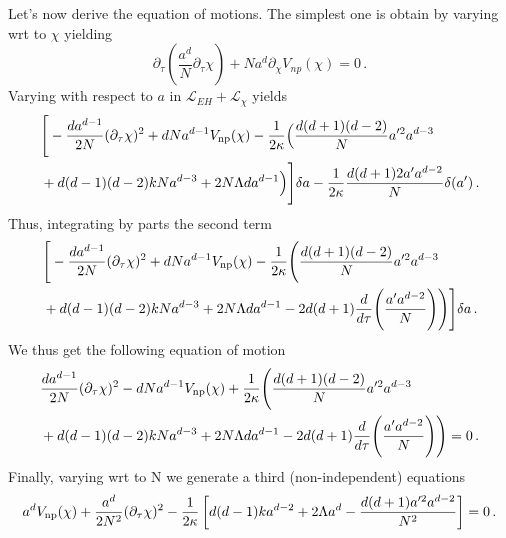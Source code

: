 \documentclass[a4paper]{article}
\begin{document}
Let's now derive the equation of motions. The simplest one is obtain by varying wrt to $\chi$ yielding
\begin{equation}
  \partial_\tau\left(\frac{a^d}{N}\partial_\tau \chi\right)+Na^{d}\partial_{\chi}V_{np}(\chi)=0\,.
\end{equation}
Varying with respect to $a$ in $\mathcal{L}_{EH}+\mathcal{L}_{\chi}$ yields
\begin{equation}
  \begin{aligned}
    &\Bigg[-\frac{d a^{d-1}}{2N}(\partial_\tau \chi)^2+d N a^{d-1} V_{\rm np}(\chi)-\frac{1}{2\kappa}\Big(\frac{d(d+1)(d-2)}{N}a'^2a^{d-3}\\
    &+d(d-1)(d-2)kNa^{d-3}+2N \Lambda d a^{d-1} \Big)\Bigg]\delta a
    -\frac{1}{2\kappa}\frac{d(d+1)2a'a^{d-2}}{N}\delta(a')\,.
  \end{aligned}
\end{equation}
Thus, integrating by parts the second term
\begin{equation}
  \begin{aligned}
    &\Bigg[-\frac{d a^{d-1}}{2N}(\partial_\tau \chi)^2+d N a^{d-1} V_{\rm np}(\chi)-\frac{1}{2\kappa}\Bigg(\frac{d(d+1)(d-2)}{N}a'^2a^{d-3}\\
    &+d(d-1)(d-2)kNa^{d-3}+2N \Lambda d a^{d-1} -2d(d+1)\frac{d}{d\tau}\Bigg(\frac{a' a^{d-2}}{N}\Bigg)\Bigg)\Bigg]\delta a\,.
  \end{aligned}
\end{equation}
We thus get the following equation of motion
\begin{equation}
  \begin{aligned}
    &\frac{d a^{d-1}}{2N}(\partial_\tau \chi)^2-d N a^{d-1} V_{\rm np}(\chi)+\frac{1}{2\kappa}\Bigg(\frac{d(d+1)(d-2)}{N}a'^2a^{d-3}\\
    &+d(d-1)(d-2)kNa^{d-3}+2N \Lambda d a^{d-1} -2d(d+1)\frac{d}{d\tau}\Bigg(\frac{a' a^{d-2}}{N}\Bigg)\Bigg)=0\,.
  \end{aligned}
\end{equation}
Finally, varying wrt to N we generate a third (non-independent) equations
\begin{equation}
  \begin{aligned}
    a^d V_{\rm np}(\chi)+\frac{a^d}{2N^2}(\partial_\tau \chi)^2-\frac{1}{2\kappa}\left[d(d-1)ka^{d-2}+2\Lambda a^d -\frac{d(d+1)a'^2 a^{d-2}}{N^2}\right]=0\,.
  \end{aligned}
\end{equation}
\end{document}
